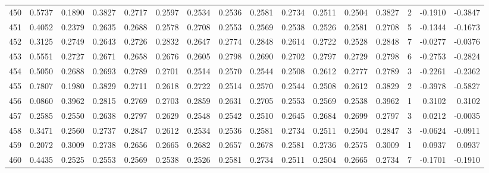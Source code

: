 \begin{tabular}{lrrrrrrrrrrrrrrr}
450 &      0.5737 &  0.1890 &  0.3827 &  0.2717 &  0.2597 &  0.2534 &  0.2536 &  0.2581 &  0.2734 &  0.2511 &   0.2504 &     0.3827 &      2 &                   -0.1910 &                    -0.3847 \\
451 &      0.4052 &  0.2379 &  0.2635 &  0.2688 &  0.2578 &  0.2708 &  0.2553 &  0.2569 &  0.2538 &  0.2526 &   0.2581 &     0.2708 &      5 &                   -0.1344 &                    -0.1673 \\
452 &      0.3125 &  0.2749 &  0.2643 &  0.2726 &  0.2832 &  0.2647 &  0.2774 &  0.2848 &  0.2614 &  0.2722 &   0.2528 &     0.2848 &      7 &                   -0.0277 &                    -0.0376 \\
453 &      0.5551 &  0.2727 &  0.2671 &  0.2658 &  0.2676 &  0.2605 &  0.2798 &  0.2690 &  0.2702 &  0.2797 &   0.2729 &     0.2798 &      6 &                   -0.2753 &                    -0.2824 \\
454 &      0.5050 &  0.2688 &  0.2693 &  0.2789 &  0.2701 &  0.2514 &  0.2570 &  0.2544 &  0.2508 &  0.2612 &   0.2777 &     0.2789 &      3 &                   -0.2261 &                    -0.2362 \\
455 &      0.7807 &  0.1980 &  0.3829 &  0.2711 &  0.2618 &  0.2722 &  0.2514 &  0.2570 &  0.2544 &  0.2508 &   0.2612 &     0.3829 &      2 &                   -0.3978 &                    -0.5827 \\
456 &      0.0860 &  0.3962 &  0.2815 &  0.2769 &  0.2703 &  0.2859 &  0.2631 &  0.2705 &  0.2553 &  0.2569 &   0.2538 &     0.3962 &      1 &                    0.3102 &                     0.3102 \\
457 &      0.2585 &  0.2550 &  0.2638 &  0.2797 &  0.2629 &  0.2548 &  0.2542 &  0.2510 &  0.2645 &  0.2684 &   0.2699 &     0.2797 &      3 &                    0.0212 &                    -0.0035 \\
458 &      0.3471 &  0.2560 &  0.2737 &  0.2847 &  0.2612 &  0.2534 &  0.2536 &  0.2581 &  0.2734 &  0.2511 &   0.2504 &     0.2847 &      3 &                   -0.0624 &                    -0.0911 \\
459 &      0.2072 &  0.3009 &  0.2738 &  0.2656 &  0.2665 &  0.2682 &  0.2657 &  0.2678 &  0.2581 &  0.2736 &   0.2575 &     0.3009 &      1 &                    0.0937 &                     0.0937 \\
460 &      0.4435 &  0.2525 &  0.2553 &  0.2569 &  0.2538 &  0.2526 &  0.2581 &  0.2734 &  0.2511 &  0.2504 &   0.2665 &     0.2734 &      7 &                   -0.1701 &                    -0.1910 \\

\end{tabular}

